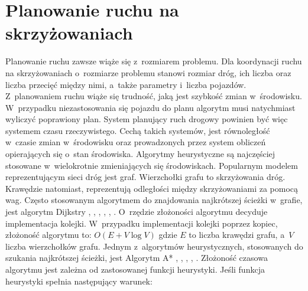  \label{chap:state-of-the-art}

\section{Planowanie ruchu na skrzyżowaniach}

Planowanie ruchu zawsze wiąże się z~rozmiarem problemu. Dla koordynacji ruchu na skrzyżowaniach o~rozmiarze problemu stanowi rozmiar dróg, ich liczba oraz liczba przecięć między nimi, a~także parametry i~liczba pojazdów. Z~planowaniem ruchu wiąże się trudność, jaką jest szybkość zmian w~środowisku. W~przypadku niezastosowania się pojazdu do planu algorytm musi natychmiast wyliczyć poprawiony plan. System planujący ruch drogowy powinien być więc systemem czasu rzeczywistego. Cechą takich systemów, jest równoległość w~czasie zmian w~środowisku oraz prowadzonych przez system obliczeń opierających się o~stan środowiska. Algorytmy heurystyczne są najczęściej stosowane w~wielokrotnie zmieniających się środowiskach.
\newline
\indent
Popularnym modelem reprezentującym sieci dróg jest graf. Wierzchołki grafu to skrzyżowania dróg. Krawędzie natomiast, reprezentują odległości między skrzyżowaniami za pomocą wag. Często stosowanym algorytmem do znajdowania najkrótszej ścieżki w~grafie, jest algorytm Dijkstry \cite{shaikh2013agv}, \cite{ando2003autonomous}, \cite{huang2013improved}, \cite{gazis1997optimal}, \cite{broxmeyer1994vehicle}, \cite{kanoh2007dynamic}. O~rzędzie złożoności algorytmu decyduje implementacja kolejki. W~przypadku implementacji kolejki poprzez kopiec, złożoność algorytmu to:
\newline
\newline
\begin{math}
O(E + V\log V)
\end{math}
\newline
\newline
gdzie \begin{math}E\end{math} to liczba krawędzi grafu, a~\begin{math}V\end{math} liczba wierzchołków grafu.
\indent
\newline
\newline
\indent
  Jednym z~algorytmów heurystycznych, stosowanych do szukania najkrótszej ścieżki, jest Algorytm A* \cite{munteanmobile}, \cite{oleiwi2014modified}, \cite{wojnicki2015robust}, \cite{elhalawany2013modified}, \cite{dechter1985generalized}. Złożoność czasowa algorytmu jest zależna od zastosowanej funkcji heurystyki. Jeśli funkcja heurystyki spełnia następujący warunek:
